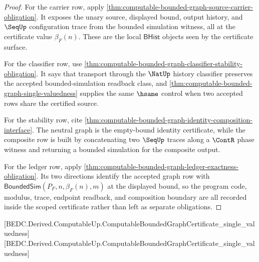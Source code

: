 \begin{proof}
For the carrier row, apply \autoref{thm:computable-bounded-graph-source-carrier-obligation}. It exposes the unary source, displayed bound, output history, and $\SeqUp$ configuration trace from the bounded simulation witness, all at the certificate value $\beta_F(n)$. These are the local $\mathsf{BHist}$ objects seen by the certificate surface.

For the classifier row, use \autoref{thm:computable-bounded-graph-classifier-stability-obligation}. It says that transport through the $\NatUp$ history classifier preserves the accepted bounded-simulation readback class, and \autoref{thm:computable-bounded-graph-single-valuedness} supplies the same $\hsame$ control when two accepted rows share the certified source.

For the stability row, cite \autoref{thm:computable-bounded-graph-identity-composition-interface}. The neutral graph is the empty-bound identity certificate, while the composite row is built by concatenating two $\SeqUp$ traces along a $\ContR$ phase witness and returning a bounded simulation for the composite output.

For the ledger row, apply \autoref{thm:computable-bounded-graph-ledger-exactness-obligation}. Its two directions identify the accepted graph row with $\mathsf{BoundedSim}(P_F,n,\beta_F(n),m)$ at the displayed bound, so the program code, modulus, trace, endpoint readback, and composition boundary are all recorded inside the scoped certificate rather than left as separate obligations.
\end{proof}

[BEDC.Derived.ComputableUp.ComputableBoundedGraphCertificate\_single\_valuedness]
[BEDC.Derived.ComputableUp.ComputableBoundedGraphCertificate\_single\_valuedness]

